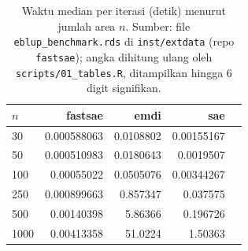 \begin{table}[htbp]
\centering
\caption{Waktu median per iterasi (detik) menurut jumlah area $n$. Sumber: file \texttt{eblup\_benchmark.rds} di \texttt{inst/extdata} (repo \texttt{fastsae}); angka dihitung ulang oleh \texttt{scripts/01\_tables.R}, ditampilkan hingga 6 digit signifikan.}
\label{tab:time-fh}
\small
\begin{tabular}{lrrrr}
\toprule
$n$ & fastsae & emdi & sae \\
\midrule
30 & 0.000588063 & 0.0108802 & 0.00155167 \\
50 & 0.000510983 & 0.0180643 & 0.0019507 \\
100 & 0.00055022 & 0.0505076 & 0.00344267 \\
250 & 0.000899663 & 0.857347 & 0.037575 \\
500 & 0.00140398 & 5.86366 & 0.196726 \\
1000 & 0.00413358 & 51.0224 & 1.50363 \\
\bottomrule
\end{tabular}
\end{table}

